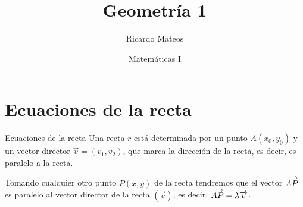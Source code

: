 \documentclass[8pt]{beamer}
\title{Geometría 1}
\author{Ricardo Mateos}
\institute[UHEI-IVED]{Departamento de Matemáticas \\ UHEI - IVED}
\date{Matemáticas I}
\begin{document}
\titleframe

\begin{frame}
\tableofcontents
\end{frame}

\section{Ecuaciones de la recta}

\begin{frame}[t]{Ecuaciones de la recta}
Una recta $r$ está determinada por un punto $A(x_0,y_0)$  y  un vector director $\vec{v}=(v_1,v_2)$, que marca la dirección de la recta, es decir, es  paralelo a la recta. 

Tomando cualquier otro punto $P(x,y)$ de la recta tendremos que el vector $\overrightarrow{AP}$ es paralelo al vector director de la recta $(\vec{v})$, es decir, $\overrightarrow{AP}=\lambda \overrightarrow{v}$.
\begin{center}
\end{center}



\end{frame}
\end{document}
